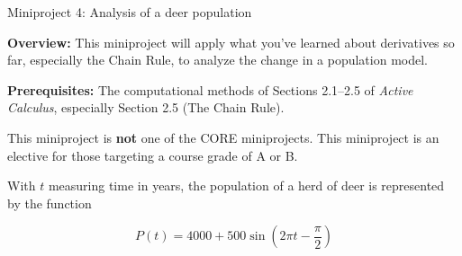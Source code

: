 \documentclass[11pt,letterpaper]{article}
\begin{document}
\begin{flushright}
	\begin{Large}
		Miniproject 4: Analysis of a deer population
	\end{Large}
\end{flushright}

\noindent
\textbf{Overview:} This miniproject will apply what you've learned about derivatives so far, especially the Chain Rule, to analyze the change in a population model. 

\medskip

\noindent
\textbf{Prerequisites:} The computational methods of Sections 2.1--2.5 of \emph{Active Calculus}, especially Section 2.5 (The Chain Rule). 

\medskip

\noindent
This miniproject is \textbf{not} one of the CORE miniprojects. This miniproject is an elective for those targeting a course grade of A or B. 
	
\hrulefill

With $t$ measuring time in years, the population of a herd of deer is represented by the function 

\[ P(t) = 4000 + 500 \sin \left(2 \pi t - \frac{\pi}{2}   \right)  \]
\end{document}
